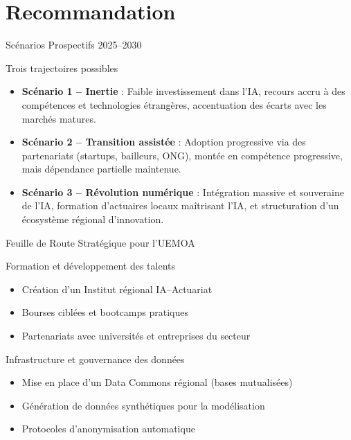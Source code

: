 \documentclass{beamer}
\begin{document}
\section{Recommandation}
\begin{frame}{Scénarios Prospectifs 2025–2030}
	\begin{block}{Trois trajectoires possibles}
		\begin{itemize}
			\item \textbf{Scénario 1 – Inertie} : Faible investissement dans l’IA, recours accru à des compétences et technologies étrangères, accentuation des écarts avec les marchés matures.
			\item \textbf{Scénario 2 – Transition assistée} : Adoption progressive via des partenariats (startups, bailleurs, ONG), montée en compétence progressive, mais dépendance partielle maintenue.
			\item \textbf{Scénario 3 – Révolution numérique} : Intégration massive et souveraine de l’IA, formation d’actuaires locaux maîtrisant l’IA, et structuration d’un écosystème régional d’innovation.
		\end{itemize}
	\end{block}
\end{frame}

\begin{frame}{Feuille de Route Stratégique pour l’UEMOA}
	\begin{block}{Formation et développement des talents}
		\begin{itemize}
			\item Création d’un Institut régional IA–Actuariat
			\item Bourses ciblées et bootcamps pratiques
			\item Partenariats avec universités et entreprises du secteur
		\end{itemize}
	\end{block}
	
	\begin{block}{Infrastructure et gouvernance des données}
		\begin{itemize}
			\item Mise en place d’un Data Commons régional (bases mutualisées)
			\item Génération de données synthétiques pour la modélisation
			\item Protocoles d’anonymisation automatique
		\end{itemize}
	\end{block}
\end{frame}
\end{document}
